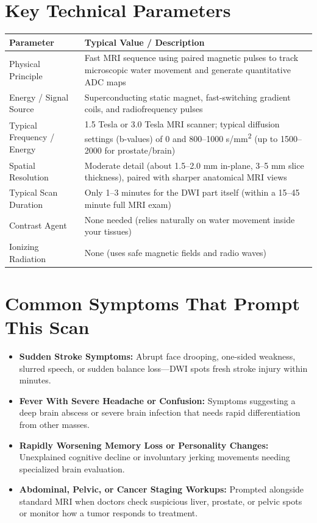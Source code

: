 \section{Key Technical Parameters}
\noindent
\begin{tabularx}{\textwidth}{@{}l X@{}}
\toprule
\textbf{Parameter} & \textbf{Typical Value / Description} \\
\midrule
Physical Principle & Fast MRI sequence using paired magnetic pulses to track microscopic water movement and generate quantitative ADC maps \\
Energy / Signal Source & Superconducting static magnet, fast-switching gradient coils, and radiofrequency pulses \\
Typical Frequency / Energy & 1.5 Tesla or 3.0 Tesla MRI scanner; typical diffusion settings (b-values) of 0 and 800--1000 s/mm\textsuperscript{2} (up to 1500--2000 for prostate/brain) \\
Spatial Resolution & Moderate detail (about 1.5--2.0 mm in-plane, 3--5 mm slice thickness), paired with sharper anatomical MRI views \\
Typical Scan Duration & Only 1--3 minutes for the DWI part itself (within a 15--45 minute full MRI exam) \\
Contrast Agent & None needed (relies naturally on water movement inside your tissues) \\
Ionizing Radiation & None (uses safe magnetic fields and radio waves) \\
\bottomrule
\end{tabularx}

\section{Common Symptoms That Prompt This Scan}
\begin{itemize}
\item \textbf{Sudden Stroke Symptoms:} Abrupt face drooping, one-sided weakness, slurred speech, or sudden balance loss---DWI spots fresh stroke injury within minutes.
\item \textbf{Fever With Severe Headache or Confusion:} Symptoms suggesting a deep brain abscess or severe brain infection that needs rapid differentiation from other masses.
\item \textbf{Rapidly Worsening Memory Loss or Personality Changes:} Unexplained cognitive decline or involuntary jerking movements needing specialized brain evaluation.
\item \textbf{Abdominal, Pelvic, or Cancer Staging Workups:} Prompted alongside standard MRI when doctors check suspicious liver, prostate, or pelvic spots or monitor how a tumor responds to treatment.
\end{itemize}

